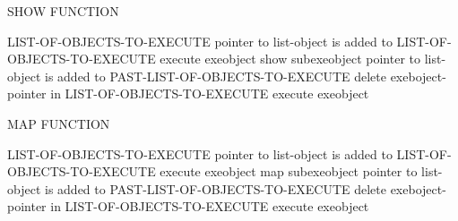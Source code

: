\documentclass[15pt,a4paper,oneside]{article}
\begin{document}
SHOW FUNCTION
\begin{algorithm}[H]\begin{algorithmic}
\STATE LIST-OF-OBJECTS-TO-EXECUTE
\STATE pointer to list-object is added to LIST-OF-OBJECTS-TO-EXECUTE 
\ENDIF
\ENDFOR
\ENDFOR
{}
\STATE execute exeobject
\STATE show subexeobject
\ENDFOR
\STATE pointer to list-object is added to PAST-LIST-OF-OBJECTS-TO-EXECUTE 
\STATE delete exeboject-pointer in LIST-OF-OBJECTS-TO-EXECUTE 
\ENDFOR
{}
\STATE execute exeobject
\ENDFOR
\end{algorithmic}\end{algorithm}

MAP FUNCTION
\begin{algorithm}[H]\begin{algorithmic}
\STATE LIST-OF-OBJECTS-TO-EXECUTE
\STATE pointer to list-object is added to LIST-OF-OBJECTS-TO-EXECUTE 
\ENDIF
\ENDFOR
\ENDFOR
{}
\STATE execute exeobject
\STATE map subexeobject
\ENDFOR
\ENDIF
\STATE pointer to list-object is added to PAST-LIST-OF-OBJECTS-TO-EXECUTE 
\STATE delete exeboject-pointer in LIST-OF-OBJECTS-TO-EXECUTE 
\ENDFOR
{}
\STATE execute exeobject
\ENDFOR
\end{algorithmic}\end{algorithm}
\end{document}
